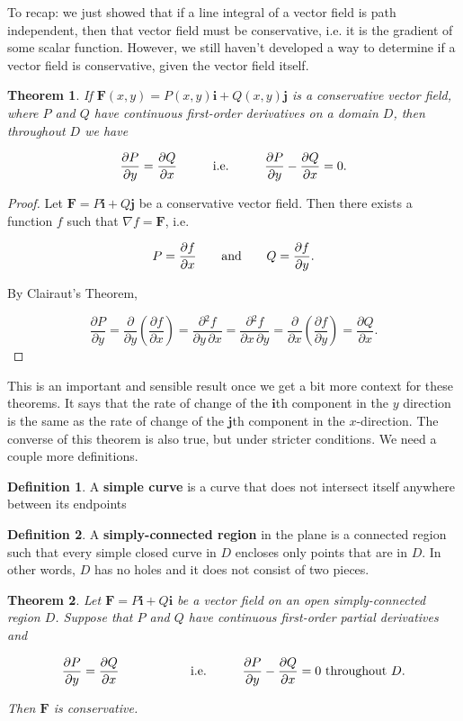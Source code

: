 \documentclass[11pt,oneside,english]{amsart}
\newtheorem{theorem}{Theorem}
\theoremstyle{definition}
\newtheorem*{definition}{Definition}
\newcommand{\aspace}{\hspace{7mm}\text{and}\hspace{7mm}}
\newcommand{\pspace}{\hspace{10mm}}
\newcommand{\pp}[2]{\frac{\partial{#1}}{\partial{#2}}}
\begin{document}
To recap: we just showed that if a line integral of a vector field is path independent, then that vector field must be conservative, i.e. it is the gradient of some scalar function. However, we still haven't developed a way to determine if a vector field is conservative, given the vector field itself. 

\begin{theorem}
If $\mathbf{F}(x,y)=P(x,y)\mathbf{i}+Q(x,y)\mathbf{j}$ is a conservative vector field, where $P$ and $Q$ have continuous first-order derivatives on a domain $D$, then throughout $D$ we have

\[
\pp{P}{y}=\pp{Q}{x}\pspace\text{i.e.}\pspace\pp{P}{y}-\pp{Q}{x}=0.
\]
\end{theorem}

\begin{proof}
Let $\mathbf{F}=P\mathbf{i}+Q\mathbf{j}$ be a conservative vector field. Then there exists a function $f$ such that $\nabla f =\mathbf{F}$, i.e.

\[
P=\pp{f}{x}\aspace Q=\pp{f}{y}.
\]

By Clairaut's Theorem,

\[
\pp{P}{y}=\pp{}{y}\left(\pp{f}{x}\right)=\pp{^2f}{y\,\partial x}=\pp{^2f}{x\,\partial y}=\pp{}{x}\left(\pp{f}{y}\right)=\pp{Q}{x}.
\]
\end{proof}

This is an important and sensible result once we get a bit more context for these theorems. It says that the rate of change of the $\mathbf{i}$th component in the $y$ direction is the same as the rate of change of the $\mathbf{j}$th component in the $x$-direction. The converse of this theorem is also true, but under stricter conditions. We need a couple more definitions. 

\begin{definition}
A \textbf{simple curve} is a curve that does not intersect itself anywhere between its endpoints
\end{definition}


\begin{definition}
A \textbf{simply-connected region} in the plane is a connected region such that every simple closed curve in $D$ encloses only points that are in $D$. In other words, $D$ has no holes and it does not consist of two pieces.
\end{definition}

\begin{theorem}
Let $\mathbf{F}=P\mathbf{i}+Q\mathbf{i}$ be a vector field on an open simply-connected region $D$. Suppose that $P$ and $Q$ have continuous first-order partial derivatives and 

\[
\pp{P}{y}=\pp{Q}{x}\pspace\pspace\text{i.e.}\pspace\pp{P}{y}-\pp{Q}{x}=0\text{ throughout $D$.}
\]

Then $\mathbf{F}$ is conservative.

\end{theorem}
\end{document}
